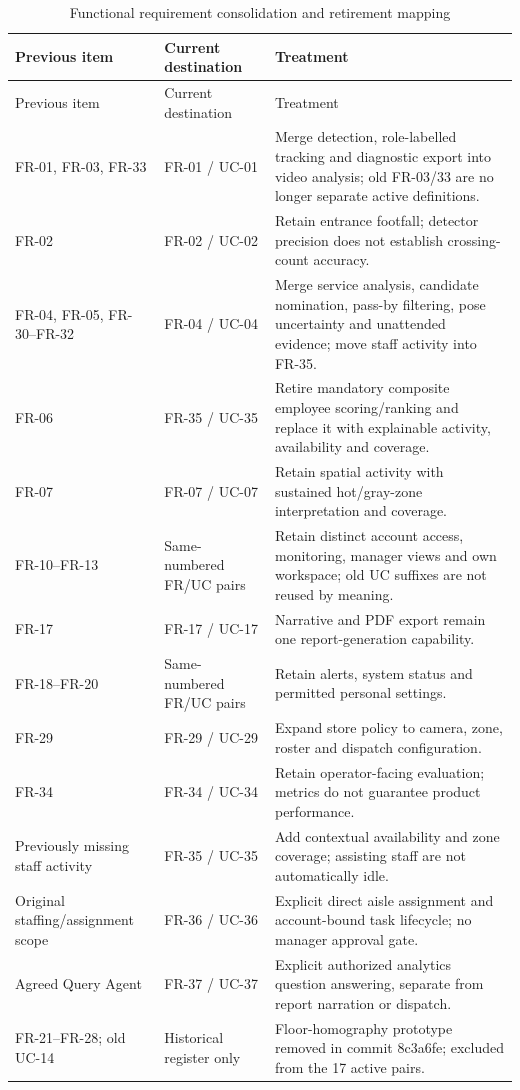 \begin{longtable}{P{0.22\textwidth}P{0.23\textwidth}P{0.45\textwidth}}
\caption{Functional requirement consolidation and retirement mapping}\label{tab:fr-migration}\\
\toprule
Previous item & Current destination & Treatment\\
\midrule
\endfirsthead
\toprule
Previous item & Current destination & Treatment\\
\midrule
\endhead
FR-01, FR-03, FR-33 & FR-01 / UC-01 & Merge detection, role-labelled tracking and diagnostic export into video analysis; old FR-03/33 are no longer separate active definitions.\\
FR-02 & FR-02 / UC-02 & Retain entrance footfall; detector precision does not establish crossing-count accuracy.\\
FR-04, FR-05, FR-30--FR-32 & FR-04 / UC-04 & Merge service analysis, candidate nomination, pass-by filtering, pose uncertainty and unattended evidence; move staff activity into FR-35.\\
FR-06 & FR-35 / UC-35 & Retire mandatory composite employee scoring/ranking and replace it with explainable activity, availability and coverage.\\
FR-07 & FR-07 / UC-07 & Retain spatial activity with sustained hot/gray-zone interpretation and coverage.\\
FR-10--FR-13 & Same-numbered FR/UC pairs & Retain distinct account access, monitoring, manager views and own workspace; old UC suffixes are not reused by meaning.\\
FR-17 & FR-17 / UC-17 & Narrative and PDF export remain one report-generation capability.\\
FR-18--FR-20 & Same-numbered FR/UC pairs & Retain alerts, system status and permitted personal settings.\\
FR-29 & FR-29 / UC-29 & Expand store policy to camera, zone, roster and dispatch configuration.\\
FR-34 & FR-34 / UC-34 & Retain operator-facing evaluation; metrics do not guarantee product performance.\\
Previously missing staff activity & FR-35 / UC-35 & Add contextual availability and zone coverage; assisting staff are not automatically idle.\\
Original staffing/assignment scope & FR-36 / UC-36 & Explicit direct aisle assignment and account-bound task lifecycle; no manager approval gate.\\
Agreed Query Agent & FR-37 / UC-37 & Explicit authorized analytics question answering, separate from report narration or dispatch.\\
FR-21--FR-28; old UC-14 & Historical register only & Floor-homography prototype removed in commit 8c3a6fe; excluded from the 17 active pairs.\\
\bottomrule
\end{longtable}
